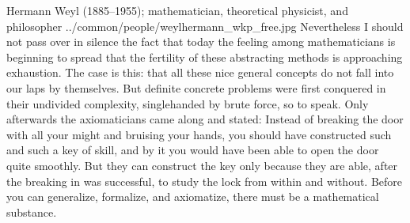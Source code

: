 
\qboxnpq
  {
    Hermann Weyl (1885--1955); mathematician, theoretical physicist, and philosopher
    \footnotemark
  }
  {../common/people/weylhermann_wkp_free.jpg}
  {Nevertheless I should not pass over in silence the fact that today the
   feeling among mathematicians is beginning to spread that the fertility
   of these abstracting methods is approaching exhaustion.
   The case is this: that all these nice general concepts do not fall into our laps by themselves.
   But definite concrete problems were first conquered in their undivided complexity,
   singlehanded by brute force, so to speak. Only afterwards the axiomaticians came along and stated:
   Instead of breaking the door with all your might and bruising your hands,
   you should have constructed such and such a key of skill,
   and by it you would have been able to open the door quite smoothly.
   But they can construct the key only because they are able, after the breaking in was successful,
   to study the lock from within and without.
   Before you can generalize, formalize, and axiomatize, there must be a mathematical substance.}

